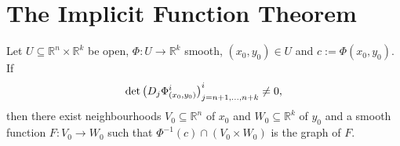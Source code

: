 \section*{The Implicit Function Theorem}

\begin{theorem}
	\label{thm:implicit_function_theorem}
	Let $U \subseteq \mathbb{R}^n \times \mathbb{R}^k$ be open, $\Phi : U \to \mathbb{R}^k$ smooth, $(x_0,y_0) \in U$ and $c := \Phi(x_0,y_0)$.  If
	\begin{equation*}
		\det\del[1]{D_j\Phi^i_{(x_0,y_0)}}^i_{j = n + 1,\dots,n + k} \neq 0,
	\end{equation*}
	\noindent then there exist neighbourhoods $V_0 \subseteq \mathbb{R}^n$ of $x_0$ and $W_0 \subseteq \mathbb{R}^k$ of $y_0$ and a smooth function $F : V_0 \to W_0$ such that $\Phi^{-1}(c) \cap (V_0 \times W_0)$ is the graph of $F$.
\end{theorem}

